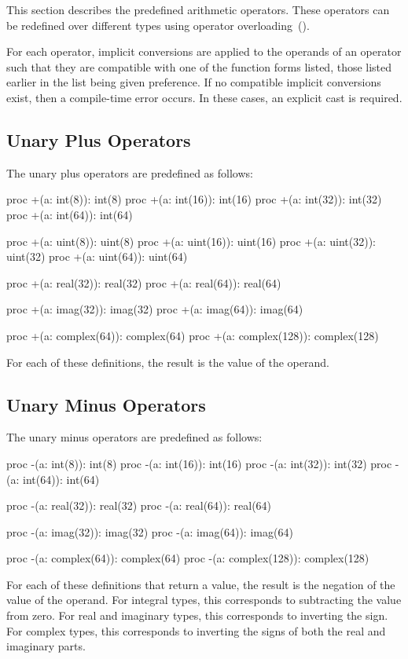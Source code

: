 This section describes the predefined arithmetic operators.  These
operators can be redefined over different types using operator
overloading~().

For each operator, implicit conversions are applied to the operands of
an operator such that they are compatible with one of the function
forms listed, those listed earlier in the list being given
preference.  If no compatible implicit conversions exist, then a
compile-time error occurs.  In these cases, an explicit cast is required.

\subsection{Unary Plus Operators}
\label{Unary_Plus_Operators}

The unary plus operators are predefined as follows:
\begin{chapel}
proc +(a: int(8)): int(8)
proc +(a: int(16)): int(16)
proc +(a: int(32)): int(32)
proc +(a: int(64)): int(64)

proc +(a: uint(8)): uint(8)
proc +(a: uint(16)): uint(16)
proc +(a: uint(32)): uint(32)
proc +(a: uint(64)): uint(64)

proc +(a: real(32)): real(32)
proc +(a: real(64)): real(64)

proc +(a: imag(32)): imag(32)
proc +(a: imag(64)): imag(64)

proc +(a: complex(64)): complex(64)
proc +(a: complex(128)): complex(128)
\end{chapel}
For each of these definitions, the result is the value of the operand.

\subsection{Unary Minus Operators}
\label{Unary_Minus_Operators}

The unary minus operators are predefined as follows:
\begin{chapel}
proc -(a: int(8)): int(8)
proc -(a: int(16)): int(16)
proc -(a: int(32)): int(32)
proc -(a: int(64)): int(64)

proc -(a: real(32)): real(32)
proc -(a: real(64)): real(64)

proc -(a: imag(32)): imag(32)
proc -(a: imag(64)): imag(64)

proc -(a: complex(64)): complex(64)
proc -(a: complex(128)): complex(128)
\end{chapel}
For each of these definitions that return a value, the result is the
negation of the value of the operand.  For integral types, this
corresponds to subtracting the value from zero.  For real and
imaginary types, this corresponds to inverting the sign.  For complex
types, this corresponds to inverting the signs of both the real and
imaginary parts.

